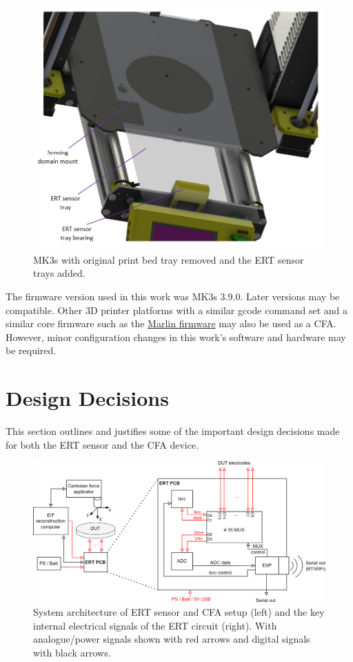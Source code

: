 \begin{figure}[H]
\centering
\includegraphics[width=0.6\linewidth]{Figures/cfa_trays_assm_labelled.png}
\caption{MK3s with original print bed tray removed and the ERT sensor trays added.}
\label{fig:mk3s_new_trays}
\end{figure}

The firmware version used in this work was MK3s 3.9.0. Later versions may be compatible. Other 3D printer platforms with a similar gcode command set and a similar core firmware such as the \href{https://marlinfw.org/}{Marlin firmware} may also be used as a CFA. However, minor configuration changes in this work's software and hardware may be required.


\section{Design Decisions}
This section outlines and justifies some of the important design decisions made for both the ERT sensor and the CFA device.
\begin{figure}[H]
\centering
\includegraphics[width=0.9\linewidth]{Figures/ERT_PCB_and_CFA_system.png}
\caption{System architecture of ERT sensor and CFA setup (left) and the key internal electrical signals of the ERT circuit (right). With analogue/power signals shown with red arrows and digital signals with black arrows.}
\label{fig:ERT_PCB_CFA_archit}
\end{figure}


